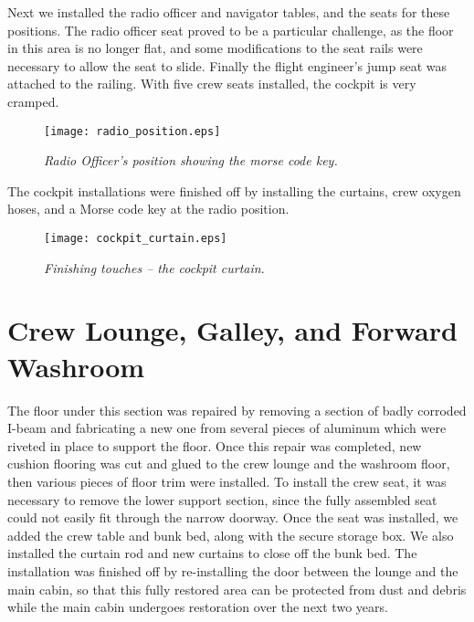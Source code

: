Next we installed
the radio officer and navigator tables, and the seats for these
positions.  The radio officer seat proved to be a particular
challenge, as the floor in this area is no longer flat, and some
modifications to the seat rails were necessary to allow the seat
to slide.  Finally the flight engineer's jump seat was attached
to the railing.  With five crew seats installed, the cockpit is
very cramped.

\begin{figure}[htbp]
   \vspace{2em}
   \centering
   \texttt{[image: radio\_position.eps]}
   \caption*{\small \em Radio Officer's position showing the morse
     code key.}
   \label{fig:radio_position}
\end{figure}

The cockpit installations were finished off by installing the
curtains, crew oxygen hoses, and a Morse code key at the radio
position.

\begin{figure}[htbp]
   \vspace{2em}
   \centering
   \texttt{[image: cockpit\_curtain.eps]}
   \caption*{\small \em Finishing touches -- the cockpit curtain.}
   \label{fig:cockpit_curtain}
\end{figure}

\section{Crew Lounge, Galley,  and Forward Washroom}
\label{crewlounge}

The floor under this section was repaired by removing a section
of badly corroded I-beam and fabricating a new one from several
pieces of aluminum which were riveted in place to support the
floor.  Once this repair was completed, new cushion flooring was
cut and glued to the crew lounge and the washroom floor, then
various pieces of floor trim were installed.  To install the crew
seat, it was necessary to remove the lower support section, since
the fully assembled seat could not easily fit through the narrow
doorway.  Once the seat was installed, we added the crew table
and bunk bed, along with the secure storage box.  We also
installed the curtain rod and new curtains to close off the bunk
bed. The installation was finished off by re-installing the door
between the lounge and the main cabin, so that this fully
restored area can be protected from dust and debris while the
main cabin undergoes restoration over the next two years.

